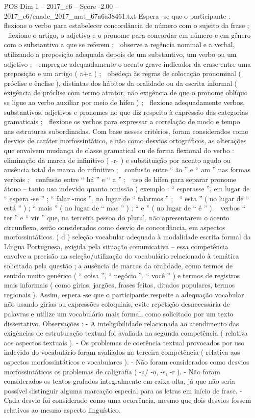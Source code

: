 \begin{textsample}{POS Dim 1 – 2017\_c6 – Score -2.00 – 2017\_c6/enade\_2017\_mat\_67a6a38461.txt}
Espera -se que o participante :  flexione o verbo para estabelecer concordância de número com o sujeito da frase ;  flexione o artigo, o adjetivo e o pronome para concordar em número e em gênero com o substantivo a que se referem ;  observe a regência nominal e a verbal, utilizando a preposição adequada depois de um substantivo, um verbo ou um adjetivo ;  empregue adequadamente o acento grave indicador da crase entre uma preposição e um artigo ( a+a ) ;  obedeça às regras de colocação pronominal ( próclise e ênclise ), distintas dos hábitos da oralidade ou da escrita informal ( exigência de próclise com termo atrator, não exigência de que o pronome oblíquo se ligue ao verbo auxiliar por meio de hífen ) ;  flexione adequadamente verbos, substantivos, adjetivos e pronomes no que diz respeito à expressão das categorias gramaticais ;  flexione os verbos para expressar a correlação de modo e tempo nas estruturas subordinadas.
Com base nesses critérios, foram considerados como desvios de caráter morfossintático, e não como desvios ortográficos, as alterações que envolvem mudança de classe gramatical ou de forma flexional do verbo :  eliminação da marca de infinitivo ( -r- ) e substituição por acento agudo ou ausência total de marca do infinitivo ;  confusão entre “ ão ” e “ am ” nas formas verbais ;  confusão entre “ há ” e “ a ” ;  uso de hífen para separar pronome átono – tanto uso indevido quanto omissão ( exemplo : “ esperasse ”, em lugar de “ espera -se ” ; “ falar -mos ”, no lugar de “ falarmos ” ;  “ esta ” ( no lugar de “ está ” ) ; “ mais ” ( no lugar de “ mas ” ) ; “ e ” ( no lugar de “ é ” ).  verbos “ ter ” e “ vir ” que, na terceira pessoa do plural, não apresentarem o acento circunflexo, serão considerados como desvio de concordância, em aspectos morfossintáticos. ( d ) seleção vocabular adequada à modalidade escrita formal da Língua Portuguesa, exigida pela situação comunicativa – essa competência envolve a precisão na seleção/utilização do vocabulário relacionado à temática solicitada pela questão ; a ausência de marcas da oralidade, como termos de sentido muito genérico ( “ coisa ”, “ negócio ”, “ você ” ) e termos de registros mais informais ( como gírias, jargões, frases feitas, ditados populares, termos regionais ).
Assim, espera -se que o participante respeite a adequação vocabular não usando gírias ou expressões coloquiais, evite repetição desnecessária de palavras e utilize um vocabulário mais formal, como solicitado por um texto dissertativo.
Observações : - A inteligibilidade relacionada ao atendimento das exigências de estruturação textual foi avaliada na segunda competência ( relativa aos aspectos textuais ). - Os problemas de coerência textual provocados por uso indevido do vocabulário foram avaliados na terceira competência ( relativa aos aspectos morfossintáticos e vocabulares ). - Não foram considerados como desvios morfossintáticos os problemas de caligrafia ( -a/ -o, -s, -r ). - Não foram considerados os textos grafados integralmente em caixa alta, já que não seria possível distinguir alguma marcação especial para as letras em início de frase. - Cada desvio foi considerado como uma ocorrência, mesmo que dois desvios fossem relativos ao mesmo aspecto linguístico.

\end{textsample}

